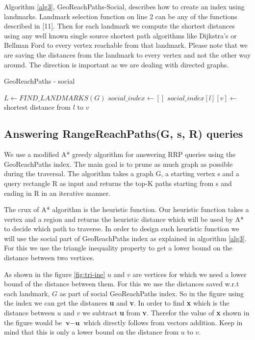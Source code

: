 {Algorithm \ref{alg3}, GeoReachPaths-Social, describes how to create an index using landmarks. Landmark selection function on line 2 can be any of the functions described in [11]. Then for each landmark we compute the shortest distances using any well known single source shortest path algorithms like Dijkstra's or Bellman Ford to every vertex reachable from that landmark. Please note that we are saving the distances from the landmark to every vertex and not the other way around. The direction is important as we are dealing with directed graphs.\\

\begin{algorithm}[t]
\caption{GeoReachPaths - social}
\label{alg2}
\begin{algorithmic}[1]

  \State $L \gets FIND\_LANDMARKS(G)$ 
  \State $social\_index \gets []$
	  	\State $social\_index[l][v] \gets $ shortest distance from $l$ to $v$
	\EndFor
  \EndFor
\EndFunction
\end{algorithmic}
\end{algorithm}

\subsection{Answering RangeReachPaths(G, s, R) queries} \label{querying}

We use a modified A* greedy algorithm for answering RRP queries using the GeoReachPaths index. The main goal is to prune as much graph as possible during the traversal. The algorithm takes a graph G, a starting vertex s and a query rectangle R as input and returns the top-K paths starting from s and ending in R in an iterative manner.

The crux of A* algorithm is the heuristic function. Our heuristic function takes a vertex and a region and returns the heuristic distance which will be used by A* to decide which path to traverse. In order to design such heuristic function we will use the social part of GeoReachPaths index as explained in algorithm \ref{alg3}. For this we use the triangle inequality property to get a lower bound on the distance between two vertices.

As shown in the figure \ref{fig:tri-ine} $u$ and $v$ are vertices for which we need a lower bound of the distance between them. For this we use the distances saved w.r.t each landmark, $G$ as part of social GeoReachPaths index. So in the figure using the index we can get the distances \textbf{u} and \textbf{v}. In order to find \textbf{x} which is the distance between $u$ and $v$ we subtract \textbf{u} from \textbf{v}. Therefor the value of \textbf{x} shown in the figure would be $\textbf{v} - \textbf{u}$ which directly follows from vectors addition. Keep in mind that this is only a lower bound on the distance from $u$ to $v$.

}
